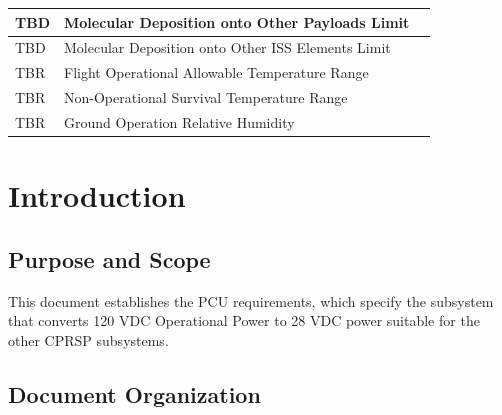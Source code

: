 \documentclass[12pt,oneside,oldfontcommands]{memoir}
\renewcommand{\contentsname}{\large\sffamily TABLE OF CONTENTS}
\renewcommand{\cftchapteraftersnum}{.0}
\renewcommand{\aftertoctitle}{%
	\par\nobreak\normalsize\bfseries\quad SECTION\mbox{}\hfill{PAGE}\par\nobreak}
\newcommand\apptoc{
  \begingroup
  \cftinsertcode{prenorm}{\setcounter{tocdepth}{-10}}
  \cftinsertcode{preapp}{\setcounter{tocdepth}{0}}
  \renewcommand\contentsname{\large\sffamily TABLE OF APPENDICES}
  \renewcommand{\aftertoctitle}{\par}
  \renewcommand{\cftchapteraftersnum}{}
  \normalfamily
  \tableofcontents*
 \endgroup
}
\begin{document}
\begin{table}[htbp]
\begin{minipage}{\linewidth}
\begin{tabular}{| >{\centering\arraybackslash}m{1.25in}| >{\centering\arraybackslash}m{2.95in}| >{\centering\arraybackslash}m{1.5in}|}
 \hline 
TBD & Molecular Deposition onto Other Payloads Limit & \pageref{tbx_17}  \\ 
 \hline 
TBD & Molecular Deposition onto Other ISS Elements Limit & \pageref{tbx_18}  \\ 
 \hline 
TBR & Flight Operational Allowable Temperature Range & \pageref{tbx_19}  \\ 
 \hline 
TBR & Non-Operational Survival Temperature Range & \pageref{tbx_20}  \\ 
 \hline 
TBR & Ground Operation Relative Humidity & \pageref{tbx_21}  \\ 
 \hline 
\end{tabular}
        \end{minipage}
        \end{table}
        \raggedright
        \clearpage%
\clearpage

\glsunsetall
\normalfont
\setlength{\beforechapskip}{-16pt}
\setcounter{tocdepth}{5}
\tableofcontents*
\setlength{\beforechapskip}{6pt}
\apptoc
\listoftables*
\listoffigures*
\glsresetall
\clearpage

\setcounter{secnumdepth}{5}

\raggedright
\setlength{\parskip}{\baselineskip}
% 





\chapter{Introduction }
\label{introduction}

\section{Purpose and Scope }
\label{purposeandscope}

This document establishes the \gls{PCU} requirements, which specify the subsystem that converts 120 \gls{VDC} Operational Power to 28 \gls{VDC} power suitable for the other \gls{CPRSP} subsystems.

\section{Document Organization }
\label{documentorganization}
\end{document}
